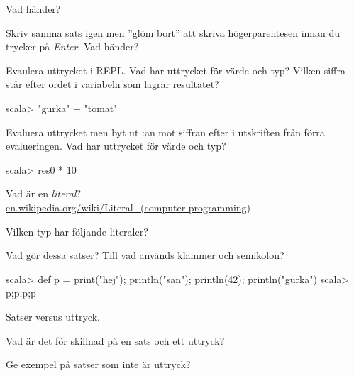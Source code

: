 \Subtask Vad händer? 

\Subtask Skriv samma sats igen men ''glöm bort'' att skriva högerparentesen innan du trycker på \textit{Enter}. Vad händer?

\Subtask Evaulera uttrycket  i REPL. Vad har uttrycket för värde och typ? Vilken siffra står efter ordet  i variabeln som lagrar resultatet?

\begin{REPLnonum}
scala> "gurka" + "tomat"   
\end{REPLnonum}

\Subtask Evaluera uttrycket  men byt ut :an mot siffran efter  i utskriften från förra evalueringen. Vad har uttrycket för värde och typ?
\begin{REPLnonum}
scala> res0 * 10
\end{REPLnonum}


\Task\Pen Vad är en \textit{literal}? \\ \href{https://en.wikipedia.org/wiki/Literal\_\%28computer_programming\%29}{en.wikipedia.org/wiki/Literal\_(computer programming)}%

\Task Vilken typ har följande literaler? %

\Subtask {} 

\Subtask {}

\Subtask {}

\Subtask {}

\Subtask {}

\Subtask {}

\Subtask {}

\Subtask {}

\Subtask {}

\Subtask {}

\Subtask {}


\Task\Pen Vad gör dessa satser? Till vad används klammer och semikolon? %
\begin{REPLnonum}
scala> def p = { print("hej"); println("san"); println(42); println("gurka") }
scala> p;p;p;p
\end{REPLnonum}

\Task\Pen Satser versus uttryck. %

\Subtask Vad är det för skillnad på en sats och ett uttryck?

\Subtask Ge exempel på satser som inte är uttryck?

